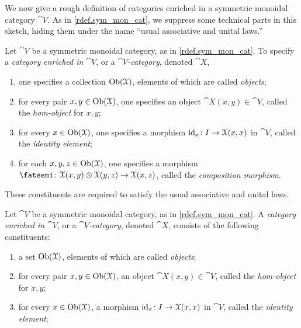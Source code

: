 \documentclass[7Sketches]{subfiles}
\begin{document}
We now give a rough definition of categories enriched in a symmetric monoidal category $\cat{V}$. As in \cref{rdef.sym_mon_cat}, we suppress some technical parts in this sketch, hiding them under the name ``usual associative and unital laws.''

\begin{roughDef}%
\label{def.enriched_in_mon_cat}%
\showhide
{%
Let $\cat{V}$ be a symmetric monoidal category, as in \cref{rdef.sym_mon_cat}. To
specify a \emph{category enriched in $\cat{V}$}, or a \emph{$\cat{V}$-category},
denoted $\cat{X}$,\begin{enumerate}[label=(\roman*)]
	\item one specifies a collection $\operatorname{Ob}(\mathcal{X})$, elements of which are called \emph{objects};
	\item for every pair $x,y\in\operatorname{Ob}(\mathcal{X})$, one specifies an object $\cat{X}(x,y)\in\cat{V}$, called the \emph{hom-object} for $x,y$;%
	\item for every $x\in\operatorname{Ob}(\mathcal{X})$, one specifies a morphism $\mathrm{id}_x\colon I\to\mathcal{X}(x,x)$ in $\cat{V}$, called the \emph{identity element};%
%
	\item for each $x,y,z\in\operatorname{Ob}(\mathcal{X})$, one specifies a morphism $\cp\colon\cat{X}(x,y)\otimes\cat{X}(y,z)\to\cat{X}(x,z)$, called the \emph{composition morphism}.%
%
\end{enumerate}
These constituents are required to satisfy the usual associative and unital laws.%
%
}
{%
Let $\cat{V}$ be a symmetric monoidal category, as in \cref{rdef.sym_mon_cat}. A \emph{category enriched in $\cat{V}$}, or a \emph{$\cat{V}$-category}, denoted $\cat{X}$, consists of the following constituents:
\begin{enumerate}[%
\label=(\roman*)]
	\item a set $\operatorname{Ob}(\mathcal{X})$, elements of which are called \emph{objects};
	\item for every pair $x,y\in\operatorname{Ob}(\mathcal{X})$, an object $\cat{X}(x,y)\in\cat{V}$, called the \emph{hom-object} for $x,y$;
	\item for every $x\in\operatorname{Ob}(\mathcal{X})$, a morphism $\mathrm{id}_x\colon I\to\mathcal{X}(x,x)$ in $\cat{V}$, called the \emph{identity element};

\end{enumerate}}
\end{roughDef}
\end{document}
